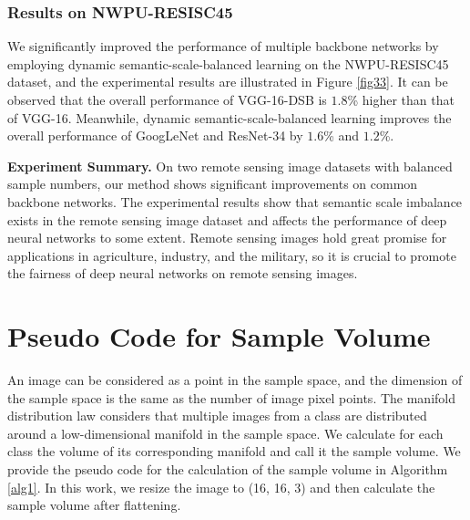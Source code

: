 \documentclass[10pt]{article} %
\begin{document}
\subsubsection{Results on NWPU-RESISC45}

We significantly improved the performance of multiple backbone networks by employing dynamic semantic-scale-balanced learning on the NWPU-RESISC45 dataset, and the experimental results are illustrated in Figure \ref{fig33}. It can be observed that the overall performance of VGG-16-DSB is $1.8$\% higher than that of VGG-16. Meanwhile, dynamic semantic-scale-balanced learning improves the overall performance of GoogLeNet and ResNet-34 by $1.6$\% and $1.2$\%.

\textbf{Experiment Summary.} On two remote sensing image datasets with balanced sample numbers, our method shows significant improvements on common backbone networks. The experimental results show that semantic scale imbalance exists in the remote sensing image dataset and affects the performance of deep neural networks to some extent. Remote sensing images hold great promise for applications in agriculture, industry, and the military, so it is crucial to promote the fairness of deep neural networks on remote sensing images.

\section{Pseudo Code for Sample Volume\label{C}}

An image can be considered as a point in the sample space, and the dimension of the sample space is the same as the number of image pixel points. The manifold distribution law considers that multiple images from a class are distributed around a low-dimensional manifold in the sample space. We calculate for each class the volume of its corresponding manifold and call it the sample volume. We provide the pseudo code for the calculation of the sample volume in Algorithm \ref{alg1}. In this work, we resize the image to (16, 16, 3) and then calculate the sample volume after flattening.
\end{document}
